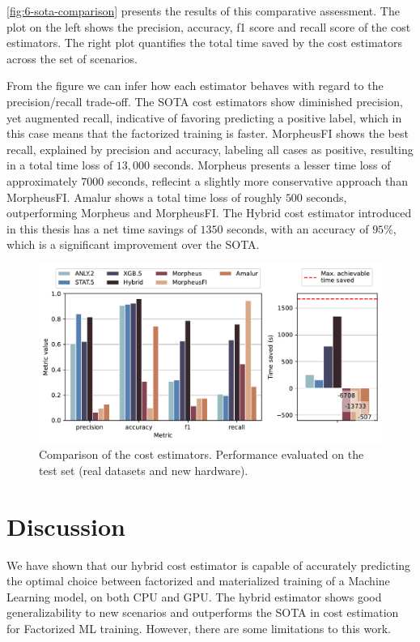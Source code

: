 \autoref{fig:6-sota-comparison} presents the results of this comparative assessment. The plot on the left shows the precision, accuracy, f1 score and recall score of the cost estimators. The right plot quantifies the total time saved by the cost estimators across the set of scenarios.

From the figure we can infer how each estimator behaves with regard to the precision/recall trade-off. The SOTA cost estimators show diminished precision, yet augmented recall, indicative of favoring predicting a positive label, which in this case means that the factorized training is faster. MorpheusFI \cite{MorpheusFI} shows the best recall, explained by precision and accuracy, labeling all cases as positive, resulting in a total time loss of $13,000$ seconds. Morpheus \cite{orion_learning_gen_lin_models} presents a lesser time loss of approximately $7000$ seconds, reflecint a slightly more conservative approach than MorpheusFI. Amalur \cite{amalur} shows a total time loss of roughly $500$ seconds, outperforming Morpheus and MorpheusFI. The Hybrid cost estimator introduced in this thesis has a net time savings of $1350$ seconds, with an accuracy of $95\%$, which is a significant improvement over the SOTA.

\begin{figure}[ht]
    \centering
    \includegraphics[width=\linewidth]{chapters/06_evaluation/figures/eval_sota_results.pdf}
    \caption[Cost estimator comparison vs. SOTA]{Comparison of the cost estimators. Performance evaluated on the test set (real datasets and new hardware).}
    \label{fig:6-sota-comparison}
\end{figure}

\section{Discussion}
\label{sec:eval-discussion}
We have shown that our hybrid cost estimator is capable of accurately predicting the optimal choice between factorized and materialized training of a Machine Learning model, on both CPU and GPU. The hybrid estimator shows good generalizability to new scenarios and outperforms the SOTA in cost estimation for Factorized ML training. However, there are some limitations to this work.


